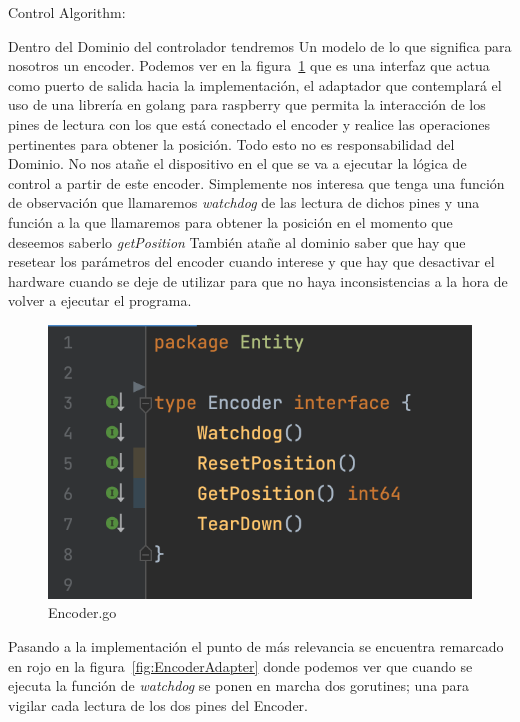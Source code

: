 Control Algorithm:



Dentro del Dominio del controlador tendremos Un modelo de lo que significa para nosotros un encoder. Podemos ver en la figura~\cref{fig:EncoderInterface} que es una interfaz que actua como puerto de salida hacia la implementación, el adaptador que contemplará el uso de una librería en golang para raspberry que permita la interacción de los pines de lectura con los que está conectado el encoder y realice las operaciones pertinentes para obtener la posición. Todo esto no es responsabilidad del Dominio. No nos atañe el dispositivo en el que se va a ejecutar la lógica de control a partir de este encoder. Simplemente nos interesa que tenga una función de observación que llamaremos \textit{watchdog} de las lectura de dichos pines y una función a la que llamaremos para obtener la posición en el momento que deseemos saberlo \textit{getPosition} También atañe al dominio saber que hay que resetear los parámetros del encoder cuando interese y que hay que desactivar el hardware cuando se deje de utilizar para que no haya inconsistencias a la hora de volver a ejecutar el programa.


\begin{figure}[H]
    \centering
    \includegraphics[height=0.2\textheight]{./part/Ejecucion/Seguimiento/PidControl/img/EncoderInterface}
    \caption{Encoder.go}\label{fig:EncoderInterface}
\end{figure}

Pasando a la implementación el punto de más relevancia se encuentra remarcado en rojo en la figura~\cref{fig:EncoderAdapter} donde podemos ver que cuando se ejecuta la función de \textit{watchdog} se ponen en marcha dos gorutines; una para vigilar cada lectura de los dos pines del Encoder.

